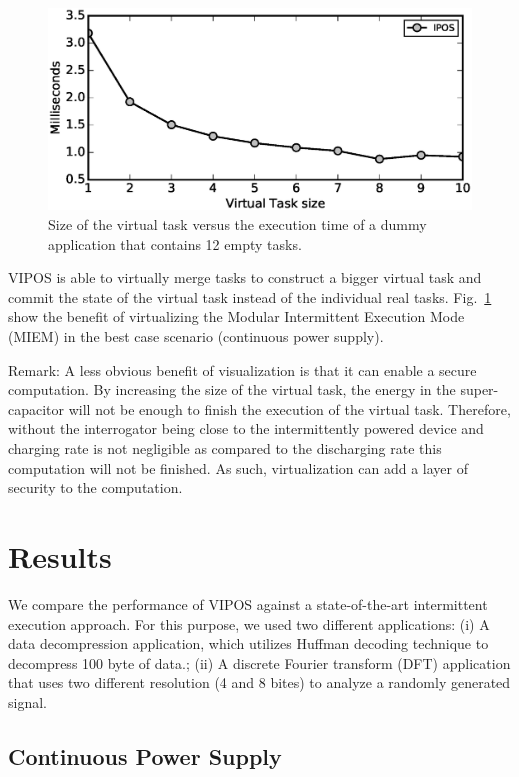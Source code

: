 \documentclass[sigconf,anonymous,review]{acmart}
\begin{document}
\begin{figure}[t]
	\centering
	\includegraphics[width=0.7\columnwidth]{figures/virtualTaskSize.eps}
	\caption{Size of the virtual task versus the execution time of a dummy application that contains 12 empty tasks.}
	\label{fig:virtualTaskSize}
\end{figure}

VIPOS is able to virtually merge tasks to construct a bigger virtual task and commit the state of the virtual task instead of the individual real tasks. 
Fig.~\ref{fig:virtualTaskSize} show the benefit of virtualizing the Modular Intermittent Execution Mode (MIEM) in the best case scenario (continuous power supply). 

Remark: A less obvious benefit of visualization is that it can enable a secure computation. By increasing the size of the virtual task, the energy in the super-capacitor will not be enough to finish the execution of the virtual task. Therefore, without the interrogator being close to the intermittently powered device and charging rate is not negligible as compared to the discharging rate this computation will not be finished. As such, virtualization can add a layer of security to the computation.

\section{Results}
We compare the performance of VIPOS against a state-of-the-art intermittent execution approach. For this purpose, we used two different applications: (i) A data decompression application, which utilizes Huffman decoding technique to decompress 100 byte of data.; (ii) A discrete Fourier transform (DFT) application that uses two different resolution (4 and 8 bites) to analyze a randomly generated signal. 

\subsection{Continuous Power Supply}
\end{document}
